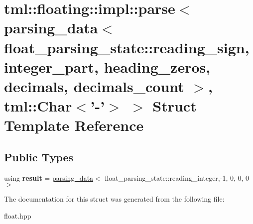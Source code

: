 \hypertarget{structtml_1_1floating_1_1impl_1_1parse_3_01parsing__data_3_01float__parsing__state_1_1reading__s89d9d1602019de9460a916e6d14cded5}{\section{tml\+:\+:floating\+:\+:impl\+:\+:parse$<$ parsing\+\_\+data$<$ float\+\_\+parsing\+\_\+state\+:\+:reading\+\_\+sign, integer\+\_\+part, heading\+\_\+zeros, decimals, decimals\+\_\+count $>$, tml\+:\+:Char$<$'-\/'$>$ $>$ Struct Template Reference}
\label{structtml_1_1floating_1_1impl_1_1parse_3_01parsing__data_3_01float__parsing__state_1_1reading__s89d9d1602019de9460a916e6d14cded5}
}
\subsection*{Public Types}
\begin{DoxyCompactItemize}
\item 
\hypertarget{structtml_1_1floating_1_1impl_1_1parse_3_01parsing__data_3_01float__parsing__state_1_1reading__s89d9d1602019de9460a916e6d14cded5_a36418a4fd2a0a88e487434dc5435f048}{using {\bfseries result} = \hyperlink{structtml_1_1floating_1_1impl_1_1parsing__data}{parsing\+\_\+data}$<$ float\+\_\+parsing\+\_\+state\+::reading\+\_\+integer,-\/1, 0, 0, 0 $>$}\label{structtml_1_1floating_1_1impl_1_1parse_3_01parsing__data_3_01float__parsing__state_1_1reading__s89d9d1602019de9460a916e6d14cded5_a36418a4fd2a0a88e487434dc5435f048}

\end{DoxyCompactItemize}


The documentation for this struct was generated from the following file\+:\begin{DoxyCompactItemize}
\item 
float.\+hpp\end{DoxyCompactItemize}
